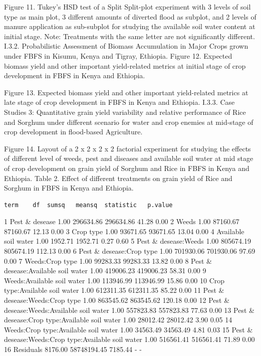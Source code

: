 \documentclass[12pt,oneside]{article}
\begin{document}
Figure 11. Tukey's HSD test of a Split Split-plot experiment with 3 levels of soil type as main plot, 3 different amounts of diverted flood as subplot, and 2 levels of manure application as sub-subplot for studying the available soil water content at initial stage.
Note: Treatments with the same letter are not significantly different.
I.3.2. Probabilistic Assessment of Biomass Accumulation in Major Crops grown under FBFS in Kisumu, Kenya and Tigray, Ethiopia.
Figure 12. Expected biomass yield and other important yield-related metrics at initial stage of crop development in FBFS in Kenya and Ethiopia.

Figure 13. Expected biomass yield and other important yield-related metrics at late stage of crop development in FBFS in Kenya and Ethiopia.
I.3.3. Case Studies 3: Quantitative grain yield variability and relative performance of Rice and Sorghum under different scenario for water and crop enemies at mid-stage of crop development in flood-based Agriculture.

Figure 14. Layout of a 2 x 2 x 2 x 2 factorial experiment for studying the effects of different level of weeds, pest and diseases and available soil water at mid stage of crop development on grain yield of Sorghum and Rice in FBFS in Kenya and Ethiopia.
Table 2. Effect of different treatments on grain yield of Rice and Sorghum in FBFS in Kenya and Ethiopia.

\begin{verbatim}
term    df  sumsq   meansq  statistic   p.value
\end{verbatim}

1 Pest \& desease 1.00 296634.86 296634.86 41.28 0.00
2 Weeds 1.00 87160.67 87160.67 12.13 0.00
3 Crop type 1.00 93671.65 93671.65 13.04 0.00
4 Available soil water 1.00 1952.71 1952.71 0.27 0.60
5 Pest \& desease:Weeds 1.00 805674.19 805674.19 112.13 0.00
6 Pest \& desease:Crop type 1.00 701930.06 701930.06 97.69 0.00
7 Weeds:Crop type 1.00 99283.33 99283.33 13.82 0.00
8 Pest \& desease:Available soil water 1.00 419006.23 419006.23 58.31 0.00
9 Weeds:Available soil water 1.00 113946.99 113946.99 15.86 0.00
10 Crop type:Available soil water 1.00 612311.35 612311.35 85.22 0.00
11 Pest \& desease:Weeds:Crop type 1.00 863545.62 863545.62 120.18 0.00
12 Pest \& desease:Weeds:Available soil water 1.00 557823.83 557823.83 77.63 0.00
13 Pest \& desease:Crop type:Available soil water 1.00 28012.42 28012.42 3.90 0.05
14 Weeds:Crop type:Available soil water 1.00 34563.49 34563.49 4.81 0.03
15 Pest \& desease:Weeds:Crop type:Available soil water 1.00 516561.41 516561.41 71.89 0.00
16 Residuals 8176.00 58748194.45 7185.44 - -
\end{document}
